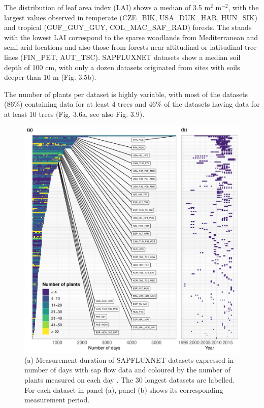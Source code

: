 \documentclass[11pt,twoside]{reedthesis}
\begin{document}
The distribution of leaf area index (LAI) shows a median of 3.5
\(\text{m}^2\) \(\text{m}^{-2}\), with the largest values observed in
temperate (CZE\_BIK, USA\_DUK\_HAR, HUN\_SIK) and tropical
(GUF\_GUY\_GUY, COL\_MAC\_SAF\_RAD) forests. The stands with the lowest
LAI correspond to the sparse woodlands from Mediterranean and semi-arid
locations and also those from forests near altitudinal or latitudinal
tree-lines (FIN\_PET, AUT\_TSC). SAPFLUXNET datasets show a median soil
depth of 100 cm, with only a dozen datasets originated from sites with
soils deeper than 10 m (Fig. 3.5b).\par

The number of plants per dataset is highly variable, with most of the
datasets (86\%) containing data for at least 4 trees and 46\% of the
datasets having data for at least 10 trees (Fig. 3.6a, see also Fig.
3.9). \par

\setlength{\abovecaptionskip}{0pt}
\begin{figure}[hbt!]

{\centering \includegraphics[width=1\linewidth]{figure/CH3/Figure6} 

}

\caption[Duration and number of plants mesured in each dataset.]{(a) Measurement duration of SAPFLUXNET datasets expressed in number of days with sap flow data and coloured by the number of plants measured on each day . The 30 longest datasets are labelled. For each dataset in panel (a), panel (b) shows its corresponding measurement period.}\label{fig:Ch2plot6}
\end{figure}
\end{document}
